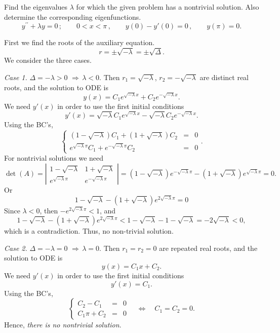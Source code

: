 \documentclass[11pt]{article}
\begin{document}
\begin{problem}
 Find the eigenvalues $\lambda$ for which the given problem has a nontrivial solution. Also determine the corresponding eigenfunctions.
\begin{equation*}
y^{\prime \prime} + \lambda y =0\,; \qquad  0<x<\pi \,, \qquad y(0) - y'(0)=0  \,,\qquad y(\pi) =0. 
\end{equation*}
\end{problem}
\begin{solution}
First we find the roots of the auxiliary equation.
\[r=\pm\sqrt{-\lambda}=\pm\sqrt{\Delta}.\]
We consider the three cases.

\par \textsl{Case 1.} $\Delta = -\lambda >0 \,\, \Rightarrow \, \lambda<0.$ Then $r_{1}=\sqrt{-\lambda}$, $r_{2}=-\sqrt{-\lambda}$ are distinct real roots, and the solution to ODE is
\[y(x)=C_{1}e^{\sqrt{-\lambda}x}+C_{2}e^{-\sqrt{-\lambda}x}.\]
We need $y'(x)$ in order to use the first initial conditions
\[y'(x)=\sqrt{-\lambda}C_{1}e^{\sqrt{-\lambda}x}-\sqrt{-\lambda}C_{2}e^{-\sqrt{-\lambda}x}.\]
Using the BC's,
\begin{equation*}
\left\{\begin{array}{rcl}
       (1-\sqrt{-\lambda})C_{1} + (1+\sqrt{-\lambda})C_{2}&=&0\\
       e^{\sqrt{-\lambda}\pi}C_{1} +e^{-\sqrt{-\lambda}\pi}C_{2}&=&0
      \end{array}\right. .
\end{equation*}
For nontrivial solutions we need 
$$\det(A)=\left|\begin{matrix}1-\sqrt{-\lambda} & 1+\sqrt{-\lambda} \\ e^{\sqrt{-\lambda}\pi} & e^{-\sqrt{-\lambda}\pi}\end{matrix}\right|=(1-\sqrt{-\lambda})e^{-\sqrt{-\lambda}\pi}-(1+\sqrt{-\lambda})e^{\sqrt{-\lambda}\pi}=0.$$ 
Or 
\[1-\sqrt{-\lambda}-(1+\sqrt{-\lambda})e^{2\sqrt{-\lambda}\pi}=0\]
Since $\lambda <0$, then $-e^{2\sqrt{-\lambda}\pi}<1$, and
\[1-\sqrt{-\lambda}-(1+\sqrt{-\lambda})e^{2\sqrt{-\lambda}\pi}<1-\sqrt{-\lambda}-1-\sqrt{-\lambda}=-2\sqrt{-\lambda}<0,\]
which is a contradiction. Thus, no non-trivial solution.

\par \textsl{Case 2.} $\Delta = -\lambda =0 \,\, \Rightarrow \, \lambda=0.$ Then $r_{1}=r_{2}=0$ are repeated real roots, and the solution to ODE is
\[y(x)=C_{1}x+C_{2}.\]
We need $y'(x)$ in order to use the first initial conditions
\[y'(x)=C_{1}.\]
Using the BC's,
\begin{equation*}
\left\{\begin{array}{rcl}
       C_{2} -C_{1}& = &0\\
       C_{1}\pi+C_{2} & = &0
      \end{array}\right. \quad \Leftrightarrow \quad C_{1}=C_{2}=0.
\end{equation*}
Hence, \textsl{there is no nontrivial solution}.


\end{solution}
\end{document}
